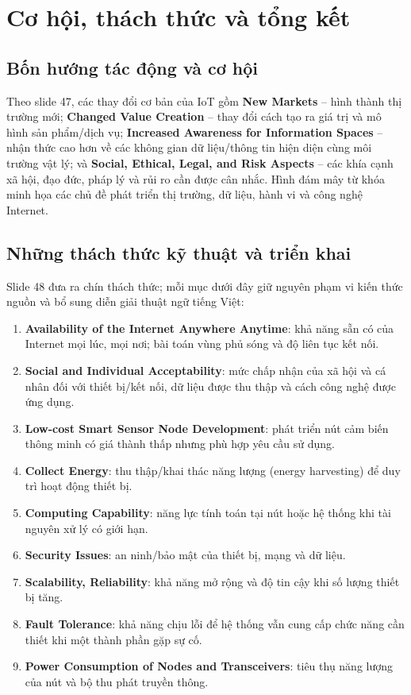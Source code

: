 \section{Cơ hội, thách thức và tổng kết}\label{sec:challenges}
\subsection{Bốn hướng tác động và cơ hội}
Theo slide 47, các thay đổi cơ bản của IoT gồm \textbf{New Markets} -- hình thành thị trường mới; \textbf{Changed Value Creation} -- thay đổi cách tạo ra giá trị và mô hình sản phẩm/dịch vụ; \textbf{Increased Awareness for Information Spaces} -- nhận thức cao hơn về các không gian dữ liệu/thông tin hiện diện cùng môi trường vật lý; và \textbf{Social, Ethical, Legal, and Risk Aspects} -- các khía cạnh xã hội, đạo đức, pháp lý và rủi ro cần được cân nhắc. Hình đám mây từ khóa minh họa các chủ đề phát triển thị trường, dữ liệu, hành vi và công nghệ Internet.

\subsection{Những thách thức kỹ thuật và triển khai}
Slide 48 đưa ra chín thách thức; mỗi mục dưới đây giữ nguyên phạm vi kiến thức nguồn và bổ sung diễn giải thuật ngữ tiếng Việt:
\begin{enumerate}
\item \textbf{Availability of the Internet Anywhere Anytime}: khả năng sẵn có của Internet mọi lúc, mọi nơi; bài toán vùng phủ sóng và độ liên tục kết nối.
\item \textbf{Social and Individual Acceptability}: mức chấp nhận của xã hội và cá nhân đối với thiết bị/kết nối, dữ liệu được thu thập và cách công nghệ được ứng dụng.
\item \textbf{Low-cost Smart Sensor Node Development}: phát triển nút cảm biến thông minh có giá thành thấp nhưng phù hợp yêu cầu sử dụng.
\item \textbf{Collect Energy}: thu thập/khai thác năng lượng (energy harvesting) để duy trì hoạt động thiết bị.
\item \textbf{Computing Capability}: năng lực tính toán tại nút hoặc hệ thống khi tài nguyên xử lý có giới hạn.
\item \textbf{Security Issues}: an ninh/bảo mật của thiết bị, mạng và dữ liệu.
\item \textbf{Scalability, Reliability}: khả năng mở rộng và độ tin cậy khi số lượng thiết bị tăng.
\item \textbf{Fault Tolerance}: khả năng chịu lỗi để hệ thống vẫn cung cấp chức năng cần thiết khi một thành phần gặp sự cố.
\item \textbf{Power Consumption of Nodes and Transceivers}: tiêu thụ năng lượng của nút và bộ thu phát truyền thông.
\end{enumerate}

